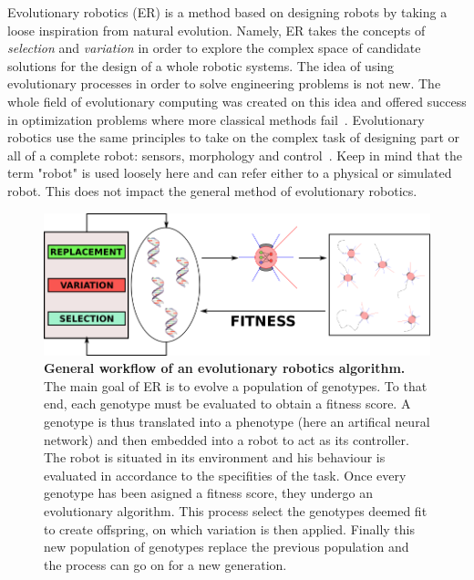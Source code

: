     Evolutionary robotics (ER) is a method based on designing robots by taking a loose inspiration from natural evolution. Namely, ER takes the concepts of \emph{selection} and \emph{variation} in order to explore the complex space of candidate solutions for the design of a whole robotic systems. The idea of using evolutionary processes in order to solve engineering problems is not new. The whole field of evolutionary computing was created on this idea and offered success in optimization problems where more classical methods fail~\parencite{Holland1975, Goldberg1989, Eiben2015}. Evolutionary robotics use the same principles to take on the complex task of designing part or all of a complete robot: sensors, morphology and control~\parencite{Nolfi2000, Floreano2008, Doncieux2015a}. Keep in mind that the term "robot" is used loosely here and can refer either to a physical or simulated robot. This does not impact the general method of evolutionary robotics.


    \begin{figure}[hbt]
        \begin{center}
          \includegraphics[scale = 0.50]{fig/Intro/EvolutionaryRobotics.png}
          \caption{\textbf{General workflow of an evolutionary robotics algorithm.}
          The main goal of ER is to evolve a population of genotypes. To that end, each genotype must be evaluated to obtain a fitness score. A genotype is thus translated into a phenotype (here an artifical neural network) and then embedded into a robot to act as its controller. The robot is situated in its environment and his behaviour is evaluated in accordance to the specifities of the task. Once every genotype has been asigned a fitness score, they undergo an evolutionary algorithm. This process select the genotypes deemed fit to create offspring, on which variation is then applied. Finally this new population of genotypes replace the previous population and the process can go on for a new generation.} 
          \label{fig:EvolutionaryRobotics}
        \end{center}
    \end{figure}

